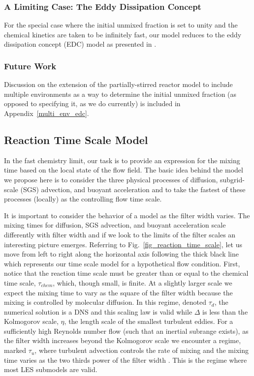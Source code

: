 \subsubsection{A Limiting Case: The Eddy Dissipation Concept}

For the special case where the initial unmixed fraction is set to unity and the chemical kinetics are taken to be infinitely fast, our model reduces to the eddy dissipation concept (EDC) model as presented in \cite{Poinsot:TNC}.

\subsubsection{Future Work}

Discussion on the extension of the partially-stirred reactor model to include multiple environments as a way to determine the initial unmixed fraction (as opposed to specifying it, as we do currently) is included in Appendix~{\ref{multi_env_edc}}.

\subsection{Reaction Time Scale Model}
\label{sec:reac_time_scale}

In the fast chemistry limit, our task is to provide an expression for the mixing time based on the local state of the flow field.  The basic idea behind the model we propose here is to consider the three physical processes of diffusion, subgrid-scale (SGS) advection, and buoyant acceleration and to take the fastest of these processes (locally) as the controlling flow time scale.

It is important to consider the behavior of a model as the filter width varies. The mixing times for diffusion, SGS advection, and buoyant acceleration scale differently with filter width and if we look to the limits of the filter scales an interesting picture emerges.  Referring to Fig.~\ref{fig_reaction_time_scale}, let us move from left to right along the horizontal axis following the thick black line which represents our time scale model for a hypothetical flow condition.  First, notice that the reaction time scale must be greater than or equal to the chemical time scale, $\tau_{chem}$, which, though small, is finite. At a slightly larger scale we expect the mixing time to vary as the square of the filter width because the mixing is controlled by molecular diffusion.  In this regime, denoted $\tau_d$, the numerical solution is a DNS and this scaling law is valid while $\Delta$ is less than the Kolmogorov scale, $\eta$, the length scale of the smallest turbulent eddies. For a sufficiently high Reynolds number flow (such that an inertial subrange exists), as the filter width increases beyond the Kolmogorov scale we encounter a regime, marked $\tau_u$, where turbulent advection controls the rate of mixing and the mixing time varies as the two thirds power of the filter width \cite{Pope:2000}.  This is the regime where most LES submodels are valid.

